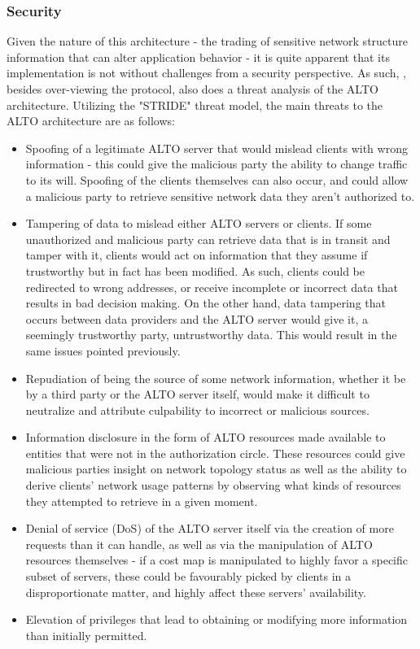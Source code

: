 \subsubsection{Security}

    Given the nature of this architecture - the trading of sensitive network structure information that can alter application behavior - it is quite apparent that its implementation is not without challenges from a security perspective.
    As such, \cite{alto-protocol}, besides over-viewing the protocol, also does a threat analysis of the ALTO architecture.
    Utilizing the "STRIDE" threat model, the main threats to the ALTO architecture are as follows:

\begin{itemize}
    \item Spoofing of a legitimate ALTO server that would mislead clients with wrong information - this could give the malicious party the ability to change traffic to its will.
        Spoofing of the clients themselves can also occur, and could allow a malicious party to retrieve sensitive network data they aren't authorized to.
    \item Tampering of data to mislead either ALTO servers or clients.
        If some unauthorized and malicious party can retrieve data that is in transit and tamper with it, clients would act on information that they assume if trustworthy but in fact has been modified.
        As such, clients could be redirected to wrong addresses, or receive incomplete or incorrect data that results in bad decision making.
        On the other hand, data tampering that occurs between data providers and the ALTO server would give it, a seemingly trustworthy party, untrustworthy data.
        This would result in the same issues pointed previously.
    \item Repudiation of being the source of some network information, whether it be by a third party or the ALTO server itself, would make it difficult to neutralize and attribute culpability to incorrect or malicious sources.
    \item Information disclosure in the form of ALTO resources made available to entities that were not in the authorization circle.
            These resources could give malicious parties insight on network topology status as well as the ability to derive clients' network usage patterns by observing what kinds of resources they attempted to retrieve in a given moment.
    \item Denial of service (DoS) of the ALTO server itself via the creation of more requests than it can handle, as well as via the manipulation of ALTO resources themselves - if a cost map is manipulated to highly favor a specific subset of servers, these could be favourably picked by clients in a disproportionate matter, and highly affect these servers' availability.
    \item Elevation of privileges that lead to obtaining or modifying more information than initially permitted.
\end{itemize}

